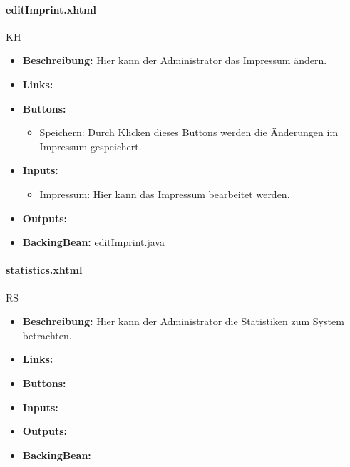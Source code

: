 				\paragraph{editImprint.xhtml}
					KH\\
					\begin{itemize}
						\item \textbf{Beschreibung:} Hier kann der Administrator das Impressum ändern.
						\item \textbf{Links:} -
						\item \textbf{Buttons:}
							\begin{itemize}
								\item Speichern: Durch Klicken dieses Buttons werden die Änderungen im Impressum gespeichert.
							\end{itemize}
						\item \textbf{Inputs:}
							\begin{itemize}
								\item Impressum: Hier kann das Impressum bearbeitet werden.
							\end{itemize}
						\item \textbf{Outputs:} -
						\item \textbf{BackingBean:} editImprint.java
					\end{itemize}
				
				\paragraph{statistics.xhtml}
					RS\\
					\begin{itemize}
						\item \textbf{Beschreibung:} Hier kann der Administrator die Statistiken zum System betrachten.
						\item \textbf{Links:}
						\item \textbf{Buttons:}
						\item \textbf{Inputs:}
						\item \textbf{Outputs:}
						\item \textbf{BackingBean:}
					\end{itemize}
